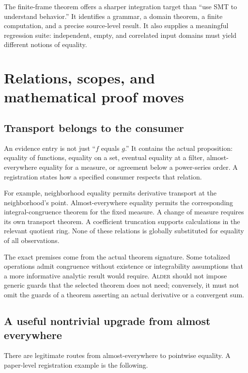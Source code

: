 \documentclass[11pt,a4paper]{article}
\newcommand{\Alder}{\textsc{Alder}}
\theoremstyle{plain}
\theoremstyle{definition}
\theoremstyle{remark}
\begin{document}
The finite-frame theorem offers a sharper integration target than ``use SMT to understand behavior.'' It identifies a grammar, a domain theorem, a finite computation, and a precise source-level result. It also supplies a meaningful regression suite: independent, empty, and correlated input domains must yield different notions of equality.

\section{Relations, scopes, and mathematical proof moves}\label{sec:relations}

\subsection{Transport belongs to the consumer}
An evidence entry is not just ``$f$ equals $g$.'' It contains the actual proposition: equality of functions, equality on a set, eventual equality at a filter, almost-everywhere equality for a measure, or agreement below a power-series order. A registration states how a specified consumer respects that relation.

For example, neighborhood equality permits derivative transport at the neighborhood's point. Almost-everywhere equality permits the corresponding integral-congruence theorem for the fixed measure. A change of measure requires its own transport theorem. A coefficient truncation supports calculations in the relevant quotient ring. None of these relations is globally substituted for equality of all observations.

The exact premises come from the actual theorem signature. Some totalized operations admit congruence without existence or integrability assumptions that a more informative analytic result would require. \Alder{} should not impose generic guards that the selected theorem does not need; conversely, it must not omit the guards of a theorem asserting an actual derivative or a convergent sum.

\subsection{A useful nontrivial upgrade from almost everywhere}
There are legitimate routes from almost-everywhere to pointwise equality. A paper-level registration example is the following.
\end{document}
